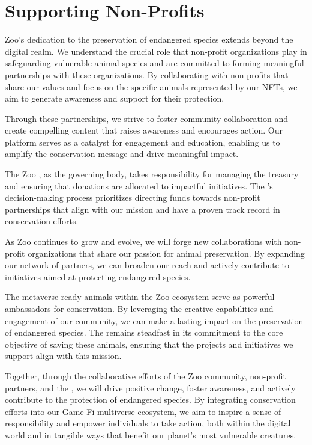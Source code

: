 \section{Supporting Non-Profits}

Zoo's dedication to the preservation of endangered species extends beyond the digital realm. We understand the crucial role that non-profit organizations play in safeguarding vulnerable animal species and are committed to forming meaningful partnerships with these organizations. By collaborating with non-profits that share our values and focus on the specific animals represented by our NFTs, we aim to generate awareness and support for their protection.

Through these partnerships, we strive to foster community collaboration and create compelling content that raises awareness and encourages action. Our platform serves as a catalyst for engagement and education, enabling us to amplify the conservation message and drive meaningful impact.

The Zoo \DAO{}, as the governing body, takes responsibility for managing the treasury and ensuring that donations are allocated to impactful initiatives. The \DAO{}'s decision-making process prioritizes directing funds towards non-profit partnerships that align with our mission and have a proven track record in conservation efforts.

As Zoo continues to grow and evolve, we will forge new collaborations with non-profit organizations that share our passion for animal preservation. By expanding our network of partners, we can broaden our reach and actively contribute to initiatives aimed at protecting endangered species.

The metaverse-ready animals within the Zoo ecosystem serve as powerful ambassadors for conservation. By leveraging the creative capabilities and engagement of our community, we can make a lasting impact on the preservation of endangered species. The \DAO{} remains steadfast in its commitment to the core objective of saving these animals, ensuring that the projects and initiatives we support align with this mission.

Together, through the collaborative efforts of the Zoo community, non-profit partners, and the \DAO{}, we will drive positive change, foster awareness, and actively contribute to the protection of endangered species. By integrating conservation efforts into our Game-Fi multiverse ecosystem, we aim to inspire a sense of responsibility and empower individuals to take action, both within the digital world and in tangible ways that benefit our planet's most vulnerable creatures.
